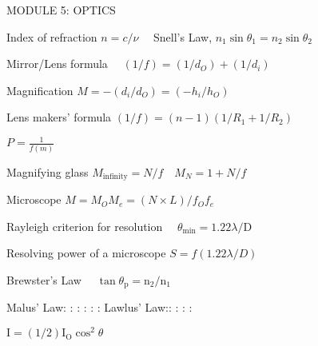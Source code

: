 \documentclass{extarticle}
\begin{document}
\begin{tcolorbox}[enhanced jigsaw,sharp corners,coltext=black,colback=BurntOrange!25!white,boxrule=pt,breakable,size=minimal]

MODULE 5: OPTICS

Index of refraction $n=c / \nu \quad$ Snell's Law, $n_{1} \sin \theta_{1}=n_{2} \sin \theta_{2}$

Mirror/Lens formula $\quad(1 / f)=\left(1 / d_{O}\right)+\left(1 / d_{i}\right)$

Magnification $M=-\left(d_{i} / d_{O}\right)=\left(-h_{i} / h_{O}\right)$

Lens makers' formula $(1 / f)=(n-1)\left(1 / R_{1}+1 / R_{2}\right)$

$P=\frac{1}{f(m)}$

Magnifying glass $M_{\text {infinity}}=N / f \quad M_{N}=1+N / f$

Microscope $M=M_{O} M_{e}=(N \times L) / f_{O} f_{e}$

Rayleigh criterion for resolution $\quad \theta_{\min }=1.22 \lambda / \mathrm{D}$

Resolving power of a microscope $S=f(1.22 \lambda / D)$

Brewster's Law $\quad \tan \theta_{\mathrm{p}}=\mathrm{n}_{2} / \mathrm{n}_{1}$

Malus' Law: : : : : : Lawlus' Law:: : : :

$\mathrm{I}=(1 / 2) \mathrm{I}_{\mathrm{O}} \cos ^{2} \theta$



\end{tcolorbox}
\end{document}
